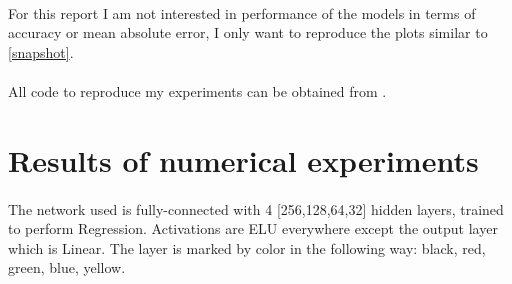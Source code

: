 \documentclass[a4paper,14pt]{extarticle}
\begin{document}
\paragraph{}
For this report I am not interested in performance of the models in terms of accuracy or mean absolute error, I only want to reproduce the plots similar to \ref{snapshot}.
\paragraph{}
All code to reproduce my experiments can be obtained from \cite{mygithub}.
\section{Results of numerical experiments}
\paragraph{}
The network used is fully-connected with 4 [256,128,64,32] hidden layers, trained to perform Regression. Activations are ELU everywhere except the output layer which is Linear. The layer is marked by color in the following way: black, red, green, blue, yellow.
\end{document}
